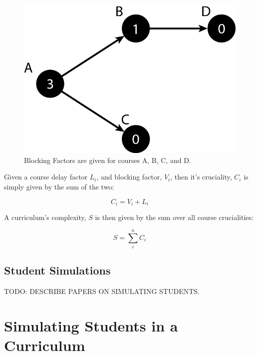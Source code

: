 \documentclass[botnum, fleqn]{unmeethesis}
\begin{document}
    \begin{figure}[h!]
      \centerline{\includegraphics[scale=0.4]{./figures/blocking_factor.png}}
      \caption{Blocking Factors are given for courses A, B, C, and D.} 
      \label{fig:blocking_factor_example}
    \end{figure}

    Given a course delay factor \(L_i\), and blocking factor, \(V_i\), then it's cruciality, \(C_i\) is simply given by the sum of the two:

    \begin{equation}
      C_{i} = V_{i} + L_{i}
    \end{equation}

    A curriculum's complexity, \(S\) is then given by the sum over all course crucialities:

    \begin{equation}
      S = \sum_{i}^n C_{i}
    \end{equation}

  \section{Student Simulations}
  TODO: DESCRIBE PAPERS ON SIMULATING STUDENTS.

\chapter{Simulating Students in a Curriculum}
\end{document}
